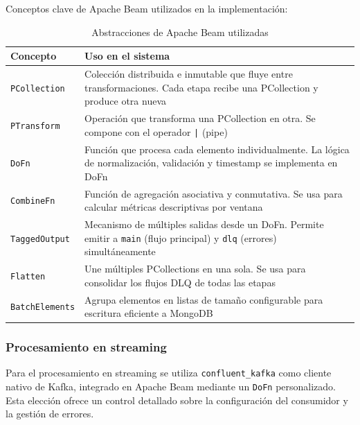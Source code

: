 \documentclass[12pt,a4paper]{article}
\begin{document}
Conceptos clave de Apache Beam utilizados en la implementación:

\begin{table}[H]
    \centering
    \caption{Abstracciones de Apache Beam utilizadas}
    \begin{tabular}{@{}lp{12cm}@{}}
        \toprule
        \textbf{Concepto}      & \textbf{Uso en el sistema}                                                                                                              \\
        \midrule
        \texttt{PCollection}   & Colección distribuida e inmutable que fluye entre transformaciones. Cada etapa recibe una PCollection y produce otra nueva              \\
        \texttt{PTransform}    & Operación que transforma una PCollection en otra. Se compone con el operador \texttt{|} (pipe)                                          \\
        \texttt{DoFn}          & Función que procesa cada elemento individualmente. La lógica de normalización, validación y timestamp se implementa en DoFn             \\
        \texttt{CombineFn}     & Función de agregación asociativa y conmutativa. Se usa para calcular métricas descriptivas por ventana                                  \\
        \texttt{TaggedOutput}  & Mecanismo de múltiples salidas desde un DoFn. Permite emitir a \texttt{main} (flujo principal) y \texttt{dlq} (errores) simultáneamente \\
        \texttt{Flatten}       & Une múltiples PCollections en una sola. Se usa para consolidar los flujos DLQ de todas las etapas                                       \\
        \texttt{BatchElements} & Agrupa elementos en listas de tamaño configurable para escritura eficiente a MongoDB                                                    \\
        \bottomrule
    \end{tabular}
\end{table}

\subsubsection{Procesamiento en streaming}\label{procesamiento-en-streaming}

Para el procesamiento en streaming se utiliza \texttt{confluent\_kafka} como cliente nativo de Kafka, integrado en Apache Beam mediante un \texttt{DoFn} personalizado. Esta elección ofrece un control detallado sobre la configuración del consumidor y la gestión de errores.
\end{document}
